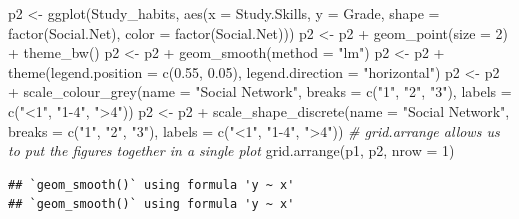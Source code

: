 \documentclass[
]{gitbook}
\newenvironment{Shaded}{\begin{snugshade}}{\end{snugshade}}
\newcommand{\AttributeTok}[1]{\textcolor[rgb]{0.77,0.63,0.00}{#1}}
\newcommand{\CommentTok}[1]{\textcolor[rgb]{0.56,0.35,0.01}{\textit{#1}}}
\newcommand{\DecValTok}[1]{\textcolor[rgb]{0.00,0.00,0.81}{#1}}
\newcommand{\FloatTok}[1]{\textcolor[rgb]{0.00,0.00,0.81}{#1}}
\newcommand{\FunctionTok}[1]{\textcolor[rgb]{0.00,0.00,0.00}{#1}}
\newcommand{\NormalTok}[1]{#1}
\newcommand{\OtherTok}[1]{\textcolor[rgb]{0.56,0.35,0.01}{#1}}
\newcommand{\SpecialCharTok}[1]{\textcolor[rgb]{0.00,0.00,0.00}{#1}}
\newcommand{\StringTok}[1]{\textcolor[rgb]{0.31,0.60,0.02}{#1}}
\begin{document}
\begin{Shaded}
\begin{Highlighting}[]
\NormalTok{p2 }\OtherTok{\textless{}{-}} \FunctionTok{ggplot}\NormalTok{(Study\_habits, }\FunctionTok{aes}\NormalTok{(}\AttributeTok{x =}\NormalTok{ Study.Skills, }\AttributeTok{y =}\NormalTok{ Grade, }\AttributeTok{shape =} \FunctionTok{factor}\NormalTok{(Social.Net),}
    \AttributeTok{color =} \FunctionTok{factor}\NormalTok{(Social.Net)))}
\NormalTok{p2 }\OtherTok{\textless{}{-}}\NormalTok{ p2 }\SpecialCharTok{+} \FunctionTok{geom\_point}\NormalTok{(}\AttributeTok{size =} \DecValTok{2}\NormalTok{) }\SpecialCharTok{+} \FunctionTok{theme\_bw}\NormalTok{()}
\NormalTok{p2 }\OtherTok{\textless{}{-}}\NormalTok{ p2 }\SpecialCharTok{+} \FunctionTok{geom\_smooth}\NormalTok{(}\AttributeTok{method =} \StringTok{"lm"}\NormalTok{)}
\NormalTok{p2 }\OtherTok{\textless{}{-}}\NormalTok{ p2 }\SpecialCharTok{+} \FunctionTok{theme}\NormalTok{(}\AttributeTok{legend.position =} \FunctionTok{c}\NormalTok{(}\FloatTok{0.55}\NormalTok{, }\FloatTok{0.05}\NormalTok{), }\AttributeTok{legend.direction =} \StringTok{"horizontal"}\NormalTok{)}
\NormalTok{p2 }\OtherTok{\textless{}{-}}\NormalTok{ p2 }\SpecialCharTok{+} \FunctionTok{scale\_colour\_grey}\NormalTok{(}\AttributeTok{name =} \StringTok{"Social Network"}\NormalTok{, }\AttributeTok{breaks =} \FunctionTok{c}\NormalTok{(}\StringTok{"1"}\NormalTok{, }\StringTok{"2"}\NormalTok{, }\StringTok{"3"}\NormalTok{),}
    \AttributeTok{labels =} \FunctionTok{c}\NormalTok{(}\StringTok{"\textless{}1"}\NormalTok{, }\StringTok{"1{-}4"}\NormalTok{, }\StringTok{"\textgreater{}4"}\NormalTok{))}
\NormalTok{p2 }\OtherTok{\textless{}{-}}\NormalTok{ p2 }\SpecialCharTok{+} \FunctionTok{scale\_shape\_discrete}\NormalTok{(}\AttributeTok{name =} \StringTok{"Social Network"}\NormalTok{, }\AttributeTok{breaks =} \FunctionTok{c}\NormalTok{(}\StringTok{"1"}\NormalTok{, }\StringTok{"2"}\NormalTok{, }\StringTok{"3"}\NormalTok{),}
    \AttributeTok{labels =} \FunctionTok{c}\NormalTok{(}\StringTok{"\textless{}1"}\NormalTok{, }\StringTok{"1{-}4"}\NormalTok{, }\StringTok{"\textgreater{}4"}\NormalTok{))}
\CommentTok{\# grid.arrange allows us to put the figures together in a single plot}
\FunctionTok{grid.arrange}\NormalTok{(p1, p2, }\AttributeTok{nrow =} \DecValTok{1}\NormalTok{)}
\end{Highlighting}
\end{Shaded}

\begin{verbatim}
## `geom_smooth()` using formula 'y ~ x'
## `geom_smooth()` using formula 'y ~ x'
\end{verbatim}
\end{document}
